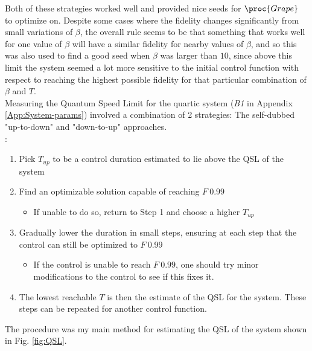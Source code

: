\documentclass[a4paper, twocolumn]{revtex4-1}
\begin{document}
Both of these strategies worked well and provided nice seeds for $\proc{Grape}$ to optimize on. Despite some cases where the fidelity changes significantly from small variations of $\beta$, the overall rule seems to be that something that works well for one value of $\beta$ will have a similar fidelity for nearby values of $\beta$, and so this was also used to find a good seed when $\beta$ was larger than $10$, since above this limit the system seemed a lot more sensitive to the initial control function with respect to reaching the highest possible fidelity for that particular combination of $\beta$ and $T$. \\

Measuring the Quantum Speed Limit for the quartic system (\textit{B1} in Appendix \ref{App:System-params}) involved a combination of 2 strategies: The self-dubbed "up-to-down" and "down-to-up" approaches. \\

:
\begin{enumerate}
	\item Pick $T_{up}$ to be a control duration estimated to lie above the QSL of the system
	\item Find an optimizable solution capable of reaching $F~0.99$
	\begin{itemize}
		\item If unable to do so, return to Step 1 and choose a higher $T_{up}$
	\end{itemize}
	\item Gradually lower the duration in small steps, ensuring at each step that the control can still be optimized to $F~0.99$
	\begin{itemize}
		\item If the control is unable to reach $F~0.99$, one should try minor modifications to the control to see if this fixes it. %
	\end{itemize}
	\item The lowest reachable $T$ is then the estimate of the QSL for the system. These steps can be repeated for another control function.
\end{enumerate}
The  procedure was my main method for estimating the QSL of the system shown in Fig. \ref{fig:QSL}.\\
\end{document}
